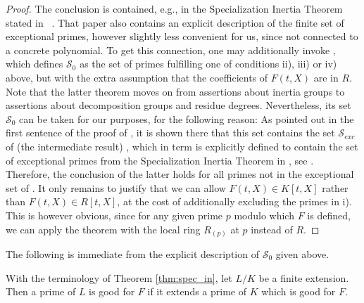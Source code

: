 \documentclass[a4paper]{amsart}
\begin{document}
  \begin{proof}
  The conclusion is contained, e.g., in the Specialization Inertia Theorem stated in \ \cite[Section 2.2.2]{Leg}. 
  That paper also contains an explicit description of the finite set of exceptional primes, however slightly less convenient for us, since not connected to a concrete polynomial.
  To get this connection, one may additionally invoke \cite[Theorem 2.2]{KN_locdim}, which defines $\mathcal{S}_0$ as the set of primes fulfilling one of conditions ii), iii) or iv) above, but with the extra assumption that the coefficients of $F(t,X)$ are in $R$. Note that the latter theorem moves on from assertions about inertia groups to assertions about decomposition groups and residue degrees. Nevertheless, its set $\mathcal{S}_0$ can be taken for our purposes, for the following reason: As pointed out in the first sentence of the proof of  \cite[Theorem 2.2]{KN_locdim}, it is shown there that this set contains the set $\mathcal{S}_{exc}$ of (the intermediate result) \cite[Theorem 4.1]{KLN}, which in term is explicitly defined to contain the set of exceptional primes from the Specialization Inertia Theorem in \cite{Leg}, see \cite[Remark 2.3]{KN_locdim}. Therefore, the conclusion of the latter holds for all primes not in the exceptional set of \cite{KN_locdim}.
  It only remains to justify that we can allow $F(t,X)\in K[t,X]$ rather than $F(t,X)\in R[t,X]$, at the cost of additionally excluding the primes in i). This is however obvious, since for any given prime $p$ modulo which $F$ is defined, we can apply the theorem with the local ring $R_{(p)}$ at $p$ instead of $R$.
  \end{proof}
  
  The following is immediate from the explicit description of $\mathcal{S}_0$ given above.
  \begin{corollary}
  \label{cor:base_change}
  With the terminology of Theorem \ref{thm:spec_in}, let $L/K$ be a finite extension. Then a prime of $L$ is good for $F$ if it extends a prime of $K$ which is good for $F$.
  \end{corollary}
  
\end{document}
